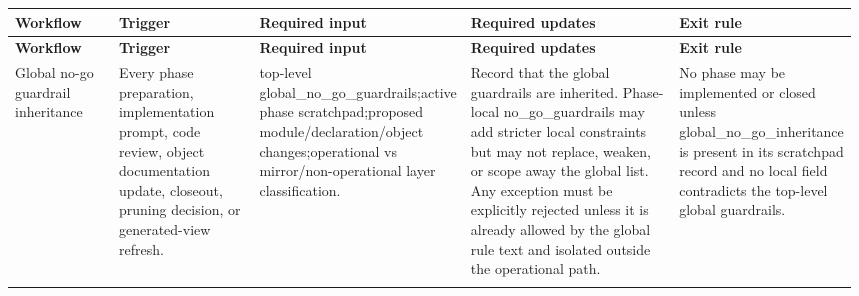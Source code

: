 \small
{}
\begin{longtable}{L{0.14\linewidth} L{0.19\linewidth} L{0.18\linewidth} L{0.31\linewidth} L{0.16\linewidth}}
\hline
\textbf{Workflow} & \textbf{Trigger} & \textbf{Required input} & \textbf{Required updates} & \textbf{Exit rule}\\
\hline
\endfirsthead
\hline
\textbf{Workflow} & \textbf{Trigger} & \textbf{Required input} & \textbf{Required updates} & \textbf{Exit rule}\\
\hline
\endhead
Global no-go guardrail inheritance & Every phase preparation, implementation prompt, code review, object documentation update, closeout, pruning decision, or generated-view refresh. & top-level global\_no\_go\_guardrails;\newline active phase scratchpad;\newline proposed module/\allowbreak{}declaration/\allowbreak{}object changes;\newline operational vs mirror/\allowbreak{}non-operational layer classification. & Record that the global guardrails are inherited. Phase-local no\_go\_guardrails may add stricter local constraints but may not replace, weaken, or scope away the global list. Any exception must be explicitly rejected unless it is already allowed by the global rule text and isolated outside the operational path. & No phase may be implemented or closed unless global\_no\_go\_inheritance is present in its scratchpad record and no local field contradicts the top-level global guardrails.\\
\hline
\addlinespace[0.24em]

\end{longtable}

